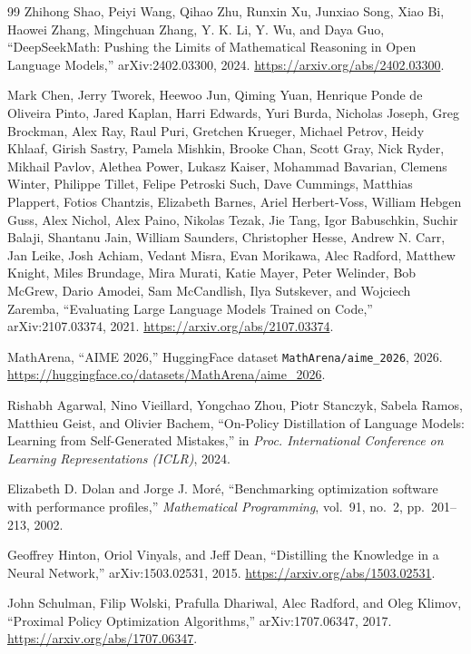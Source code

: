 \begin{thebibliography}{99}
 Zhihong Shao, Peiyi Wang, Qihao Zhu, Runxin Xu, Junxiao Song, Xiao Bi, Haowei Zhang, Mingchuan Zhang, Y. K. Li, Y. Wu, and Daya Guo, ``DeepSeekMath: Pushing the Limits of Mathematical Reasoning in Open Language Models,'' arXiv:2402.03300, 2024. \url{https://arxiv.org/abs/2402.03300}.

 Mark Chen, Jerry Tworek, Heewoo Jun, Qiming Yuan, Henrique Ponde de Oliveira Pinto, Jared Kaplan, Harri Edwards, Yuri Burda, Nicholas Joseph, Greg Brockman, Alex Ray, Raul Puri, Gretchen Krueger, Michael Petrov, Heidy Khlaaf, Girish Sastry, Pamela Mishkin, Brooke Chan, Scott Gray, Nick Ryder, Mikhail Pavlov, Alethea Power, Lukasz Kaiser, Mohammad Bavarian, Clemens Winter, Philippe Tillet, Felipe Petroski Such, Dave Cummings, Matthias Plappert, Fotios Chantzis, Elizabeth Barnes, Ariel Herbert-Voss, William Hebgen Guss, Alex Nichol, Alex Paino, Nikolas Tezak, Jie Tang, Igor Babuschkin, Suchir Balaji, Shantanu Jain, William Saunders, Christopher Hesse, Andrew N. Carr, Jan Leike, Josh Achiam, Vedant Misra, Evan Morikawa, Alec Radford, Matthew Knight, Miles Brundage, Mira Murati, Katie Mayer, Peter Welinder, Bob McGrew, Dario Amodei, Sam McCandlish, Ilya Sutskever, and Wojciech Zaremba, ``Evaluating Large Language Models Trained on Code,'' arXiv:2107.03374, 2021. \url{https://arxiv.org/abs/2107.03374}.

 MathArena, ``AIME 2026,'' HuggingFace dataset \texttt{MathArena/aime\_2026}, 2026. \url{https://huggingface.co/datasets/MathArena/aime_2026}.

 Rishabh Agarwal, Nino Vieillard, Yongchao Zhou, Piotr Stanczyk, Sabela Ramos, Matthieu Geist, and Olivier Bachem, ``On-Policy Distillation of Language Models: Learning from Self-Generated Mistakes,'' in \emph{Proc. International Conference on Learning Representations (ICLR)}, 2024.

 Elizabeth D. Dolan and Jorge J. Moré, ``Benchmarking optimization software with performance profiles,'' \emph{Mathematical Programming}, vol.~91, no.~2, pp.~201--213, 2002.

 Geoffrey Hinton, Oriol Vinyals, and Jeff Dean, ``Distilling the Knowledge in a Neural Network,'' arXiv:1503.02531, 2015. \url{https://arxiv.org/abs/1503.02531}.

 John Schulman, Filip Wolski, Prafulla Dhariwal, Alec Radford, and Oleg Klimov, ``Proximal Policy Optimization Algorithms,'' arXiv:1707.06347, 2017. \url{https://arxiv.org/abs/1707.06347}.


\end{thebibliography}
